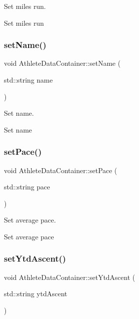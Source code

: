 Set miles run. 

Set miles run \mbox{\label{classAthleteDataContainer_a486090438f2dfc3308ddc762ec414ee3}} 
\subsubsection{\texorpdfstring{setName()}{setName()}}
{\footnotesize\ttfamily void Athlete\+Data\+Container\+::set\+Name (\begin{DoxyParamCaption}\item[{std\+::string}]{name }\end{DoxyParamCaption})}



Set name. 

Set name \mbox{\label{classAthleteDataContainer_a539a652697ef09f57f0460bebc7cf403}} 
\subsubsection{\texorpdfstring{setPace()}{setPace()}}
{\footnotesize\ttfamily void Athlete\+Data\+Container\+::set\+Pace (\begin{DoxyParamCaption}\item[{std\+::string}]{pace }\end{DoxyParamCaption})}



Set average pace. 

Set average pace \mbox{\label{classAthleteDataContainer_a8c599993fe3f754a9bcb4e15fc8eb4eb}} 
\subsubsection{\texorpdfstring{setYtdAscent()}{setYtdAscent()}}
{\footnotesize\ttfamily void Athlete\+Data\+Container\+::set\+Ytd\+Ascent (\begin{DoxyParamCaption}\item[{std\+::string}]{ytd\+Ascent }\end{DoxyParamCaption})}



